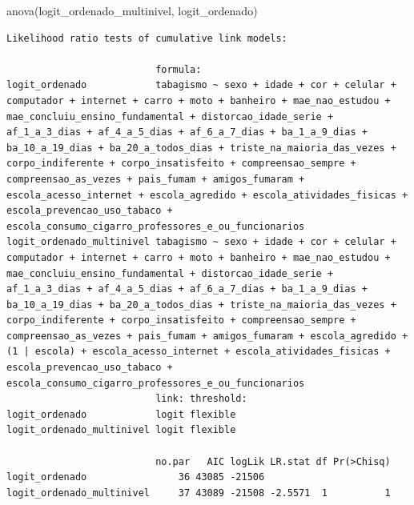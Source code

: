 \documentclass[
]{article}
\newenvironment{Shaded}{\begin{snugshade}}{\end{snugshade}}
\newcommand{\FunctionTok}[1]{\textcolor[rgb]{0.28,0.35,0.67}{#1}}
\newcommand{\NormalTok}[1]{\textcolor[rgb]{0.00,0.23,0.31}{#1}}
\begin{document}
\begin{Shaded}
\begin{Highlighting}[]
\FunctionTok{anova}\NormalTok{(logit\_ordenado\_multinivel, logit\_ordenado)}
\end{Highlighting}
\end{Shaded}

\begin{verbatim}
Likelihood ratio tests of cumulative link models:
 
                          formula:                                                                                                                                                                                                                                                                                                                                                                                                                                                                                                                                                                                                      
logit_ordenado            tabagismo ~ sexo + idade + cor + celular + computador + internet + carro + moto + banheiro + mae_nao_estudou + mae_concluiu_ensino_fundamental + distorcao_idade_serie + af_1_a_3_dias + af_4_a_5_dias + af_6_a_7_dias + ba_1_a_9_dias + ba_10_a_19_dias + ba_20_a_todos_dias + triste_na_maioria_das_vezes + corpo_indiferente + corpo_insatisfeito + compreensao_sempre + compreensao_as_vezes + pais_fumam + amigos_fumaram + escola_acesso_internet + escola_agredido + escola_atividades_fisicas + escola_prevencao_uso_tabaco +      escola_consumo_cigarro_professores_e_ou_funcionarios               
logit_ordenado_multinivel tabagismo ~ sexo + idade + cor + celular + computador + internet + carro + moto + banheiro + mae_nao_estudou + mae_concluiu_ensino_fundamental + distorcao_idade_serie + af_1_a_3_dias + af_4_a_5_dias + af_6_a_7_dias + ba_1_a_9_dias + ba_10_a_19_dias + ba_20_a_todos_dias + triste_na_maioria_das_vezes + corpo_indiferente + corpo_insatisfeito + compreensao_sempre + compreensao_as_vezes + pais_fumam + amigos_fumaram + escola_agredido + (1 | escola) + escola_acesso_internet + escola_atividades_fisicas +      escola_prevencao_uso_tabaco + escola_consumo_cigarro_professores_e_ou_funcionarios
                          link: threshold:
logit_ordenado            logit flexible  
logit_ordenado_multinivel logit flexible  

                          no.par   AIC logLik LR.stat df Pr(>Chisq)
logit_ordenado                36 43085 -21506                      
logit_ordenado_multinivel     37 43089 -21508 -2.5571  1          1
\end{verbatim}
\end{document}
